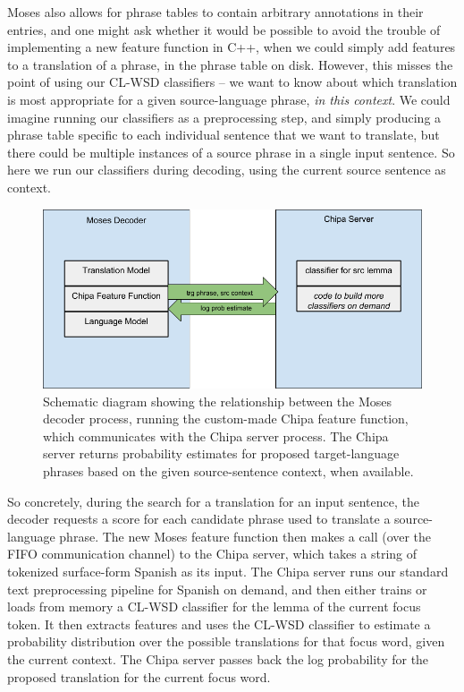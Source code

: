 Moses also allows for phrase tables to contain arbitrary annotations in their
entries, and one might ask whether it would be possible to avoid the
trouble of implementing a new feature function in C++, when we could simply
add features to a translation of a phrase, in the phrase table on disk.
However, this misses the point of using our CL-WSD classifiers -- we want to
know about which translation is most appropriate for a given source-language
phrase, \emph{in this context}. We could imagine running our classifiers as a
preprocessing step, and simply producing a phrase table specific to each
individual sentence that we want to translate, but there could be multiple
instances of a source phrase in a single input sentence. So here we run our
classifiers during decoding, using the current source sentence as context.

\begin{figure}
  \begin{centering}
  \includegraphics[width=15cm]{moses-chipa-diagram.png}
  \end{centering}
  \caption{Schematic diagram showing the relationship between the Moses decoder
  process, running the custom-made Chipa feature function, which communicates
  with the Chipa server process. The Chipa server returns probability
  estimates for proposed target-language phrases based on the given
  source-sentence context, when available.}
  \label{fig:moses-chipa-diagram}
\end{figure}

So concretely, during the search for a translation for an input sentence, the
decoder requests a score for each candidate phrase used to translate a
source-language phrase. The new Moses feature function then makes a call (over
the FIFO communication channel) to the Chipa server, which takes a string of
tokenized surface-form Spanish as its input. The Chipa server runs our standard
text preprocessing pipeline for Spanish on demand, and then either trains or
loads from memory a CL-WSD classifier for the lemma of the current focus token.
It then extracts features and uses the CL-WSD classifier to estimate a
probability distribution over the possible translations for that focus word,
given the current context. The Chipa server passes back the log probability for
the proposed translation for the current focus word.

